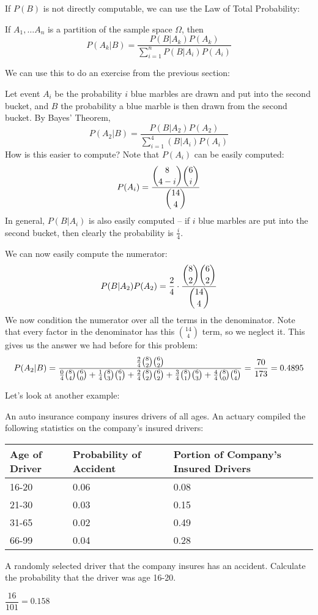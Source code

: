 \documentclass[../main.tex]{subfiles}
\begin{document}
If $P(B)$ is not directly computable, we can use the Law of Total Probability: 
\begin{corollary}
If $A_1, \ldots A_n$ is a partition of the sample space $\Omega$, then 
\[
	P(A_k|B) = \frac{P(B|A_k) P(A_k)}{\sum_{i=1}^n P(B|A_i) P(A_i)}
\]
\end{corollary}

We can use this to do an exercise from the previous section: 
\begin{solution} %
Let event $A_i$ be the probability $i$ blue marbles are drawn and put into the second bucket, and $B$ the probability a blue marble is then drawn from the second bucket. By Bayes' Theorem,
\[
	P(A_2|B) = \frac{P(B|A_2) P(A_2)}{\sum_{i=1}^4 (B|A_i) P(A_i)}
\]
How is this easier to compute? Note that $P(A_i)$ can be easily computed: 
\[
	P(A_i) = \frac{\dbinom{8}{4-i} \dbinom{6}{i}}{\dbinom{14}{4}}
\]
In general, $P(B|A_i)$ is also easily computed -- if $i$ blue marbles are put into the second bucket, then clearly the probability is $\frac{i}{4}$. 

We can now easily compute the numerator: 
\[
	P(B|A_2) P(A_2) = \frac{2}{4} \cdot \frac{\dbinom{8}{2} \dbinom{6}{2}}{\dbinom{14}{4}}
\]
We now condition the numerator over all the terms in the denominator. Note that every factor in the denominator has this $\binom{14}{4}$  term, so we neglect it. This gives us the answer we had before for this problem: 
\[
	P(A_2|B) = \frac{\frac{2}{4}\tbinom{8}{2} \tbinom{6}{2}}{\frac{0}{4}\tbinom{8}{4} \tbinom{6}{0} + \frac{1}{4}\tbinom{8}{3} \tbinom{6}{1} + \frac{2}{4}\tbinom{8}{2} \tbinom{6}{2} + \frac{3}{4}\tbinom{8}{1} \tbinom{6}{3} + \frac{4}{4}\tbinom{8}{0} \tbinom{6}{4}} = \frac{70}{173} = 0.4895
\]
\end{solution}
Let's look at another example:
\begin{example}


An auto insurance company insures drivers of all ages. An actuary compiled
the following statistics on the company’s insured drivers:

\begin{center}
	
\begin{tabular}{|p{0.5in}|p{0.8in}|p{1.5in}|}

	\hline
	Age of
Driver
& Probability
of Accident & 	Portion of Company’s
Insured Drivers
\\
	\hline
	16-20 & 0.06 & 0.08 \\
	21-30 & 0.03 & 0.15 \\
	31-65 & 0.02 & 0.49 \\
	66-99 & 0.04 & 0.28 \\
	\hline
\end{tabular}

\end{center}
A randomly selected driver that the company insures has an accident. Calculate the probability that the driver was age 16-20.
\end{example}
\begin{solution}[Answer.]
$\dfrac{16}{101} = 0.158$
\end{solution}
\end{document}
